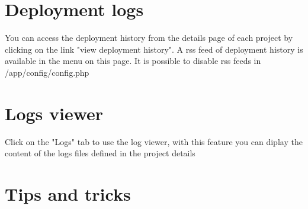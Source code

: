 \documentclass[12pt,a4paper]{report}
\begin{document}
\section{Deployment logs}
You can access the deployment history from the details page of each project by clicking on the link "view deployment history". A rss feed of deployment history is available in the menu on this page. It is possible to disable rss feeds in /app/config/config.php 

\section{Logs viewer}
Click on the "Logs" tab to use the log viewer, with this feature you can diplay the content of the logs files defined in the project details

\section{Tips and tricks}
\end{document}

